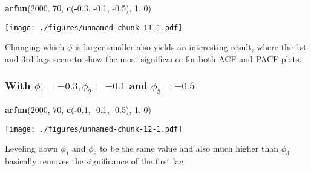 \documentclass[]{article}
\newenvironment{Shaded}{\begin{snugshade}}{\end{snugshade}}
\newcommand{\DecValTok}[1]{\textcolor[rgb]{0.00,0.00,0.81}{#1}}
\newcommand{\FloatTok}[1]{\textcolor[rgb]{0.00,0.00,0.81}{#1}}
\newcommand{\KeywordTok}[1]{\textcolor[rgb]{0.13,0.29,0.53}{\textbf{#1}}}
\newcommand{\NormalTok}[1]{#1}
\newcommand{\OperatorTok}[1]{\textcolor[rgb]{0.81,0.36,0.00}{\textbf{#1}}}
\begin{document}
\begin{Shaded}
\begin{Highlighting}[]
\KeywordTok{arfun}\NormalTok{(}\DecValTok{2000}\NormalTok{, }\DecValTok{70}\NormalTok{, }\KeywordTok{c}\NormalTok{(}\OperatorTok{-}\FloatTok{0.3}\NormalTok{, }\FloatTok{-0.1}\NormalTok{, }\FloatTok{-0.5}\NormalTok{), }\DecValTok{1}\NormalTok{, }\DecValTok{0}\NormalTok{)}
\end{Highlighting}
\end{Shaded}

\texttt{[image: ./figures/unnamed-chunk-11-1.pdf]}

Changing which \(\phi\) is larger.smaller also yields an interesting
result, where the 1st and 3rd lags seem to show the most significance
for both ACF and PACF plots.

\hypertarget{with-phi_1--0.3-phi_2--0.1-and-phi_3--0.5-1}{%
\subsubsection{\texorpdfstring{With \(\phi_1 = -0.3, \phi_2 = -0.1\) and
\(\phi_3 = -0.5\)}{With \textbackslash{}phi\_1 = -0.3, \textbackslash{}phi\_2 = -0.1 and \textbackslash{}phi\_3 = -0.5}}\label{with-phi_1--0.3-phi_2--0.1-and-phi_3--0.5-1}}

\begin{Shaded}
\begin{Highlighting}[]
\KeywordTok{arfun}\NormalTok{(}\DecValTok{2000}\NormalTok{, }\DecValTok{70}\NormalTok{, }\KeywordTok{c}\NormalTok{(}\OperatorTok{-}\FloatTok{0.1}\NormalTok{, }\FloatTok{-0.1}\NormalTok{, }\FloatTok{-0.5}\NormalTok{), }\DecValTok{1}\NormalTok{, }\DecValTok{0}\NormalTok{)}
\end{Highlighting}
\end{Shaded}

\texttt{[image: ./figures/unnamed-chunk-12-1.pdf]}

Leveling down \(\phi_1\) and \(\phi_2\) to be the same value and also
much higher than \(\phi_3\) basically removes the significance of the
first lag.
\end{document}
